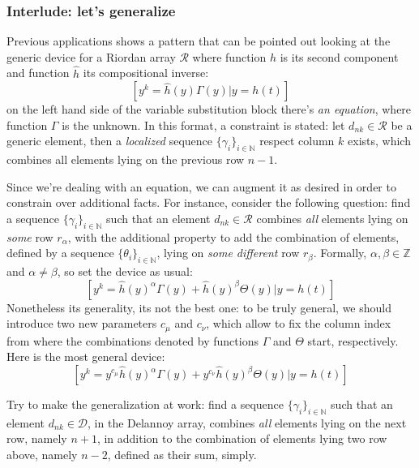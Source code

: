 \subsubsection{Interlude: let's generalize}

Previous applications shows a pattern that can be pointed out looking at 
the generic device for a Riordan array $\mathcal{R}$ where 
function $h$ is its second component and function $\hat{h}$ its compositional
inverse:
\begin{displaymath}
    \left[y^{k} = \hat{h}(y) \Gamma(y) \big| y = h(t) \right]
\end{displaymath}
on the left hand side of the variable substitution block there's \emph{an
equation}, where function $\Gamma$ is the unknown. In this format, 
a constraint is stated: let $d_{nk}\in\mathcal{R}$ be a generic element, 
then a \emph{localized} sequence 
$\lbrace \gamma_{i} \rbrace_{i\in\mathbb{N}}$ respect column $k$ exists, which
combines all elements lying on the previous row $n-1$.

Since we're dealing with an equation, we can augment it as desired in order to
constrain over additional facts. For instance, consider the following question:
find a sequence $\lbrace \gamma_{i} \rbrace_{i\in\mathbb{N}}$ such that 
an element $d_{nk}\in\mathcal{R}$ combines \emph{all} elements lying on 
\emph{some} row $r_\alpha$, with the additional property to add the combination of 
elements, defined by a sequence $\lbrace \theta_{i} \rbrace_{i\in\mathbb{N}}$, 
lying on \emph{some different} row $r_\beta$. Formally, $\alpha,\beta\in\mathbb{Z}$ 
and $\alpha \not=\beta$, so set the device as usual:
\begin{displaymath}
    \left[y^{k} = \hat{h}(y)^{\alpha} \Gamma(y) + \hat{h}(y)^{\beta} \Theta(y) \big| y = h(t) \right]
\end{displaymath}
Nonetheless its generality, its not the best one: to be truly general,
we should introduce two new parameters $c_\mu$ and $c_\nu$, which allow
to fix the column index from where the combinations denoted by functions
$\Gamma$ and $\Theta$ start, respectively. Here is the most general device:
\begin{displaymath}
    \left[y^{k} = y^{c_\mu}\hat{h}(y)^{\alpha} \Gamma(y) + 
        y^{c_\nu}\hat{h}(y)^{\beta} \Theta(y) \big| y = h(t) \right]
\end{displaymath}

Try to make the generalization at work:
find a sequence $\lbrace \gamma_{i} \rbrace_{i\in\mathbb{N}}$ such that 
an element $d_{nk}\in\mathcal{D}$, in the Delannoy array, 
combines \emph{all} elements lying on 
the next row, namely $n+1$, in addition to the
combination of elements lying two row above, namely $n-2$, 
defined as their sum, simply. 

